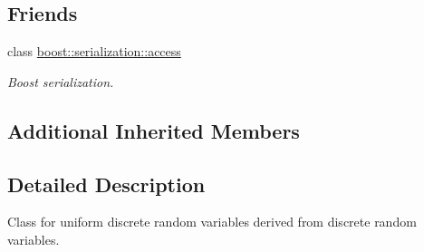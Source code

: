 \subsection*{Friends}
\begin{DoxyCompactItemize}
\item 
class \hyperlink{class_c_uniform_d_r_v_ac98d07dd8f7b70e16ccb9a01abf56b9c}{boost\-::serialization\-::access}
\begin{DoxyCompactList}\small\item\em Boost serialization. \end{DoxyCompactList}\end{DoxyCompactItemize}
\subsection*{Additional Inherited Members}


\subsection{Detailed Description}
Class for uniform discrete random variables derived from discrete random variables. 

